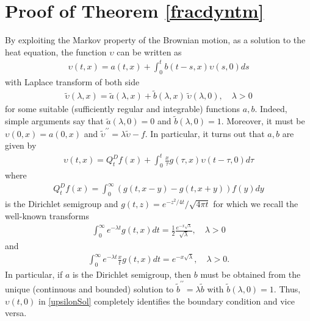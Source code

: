 \documentclass[11pt,a4paper]{article}
\theoremstyle{plain}
\theoremstyle{definition}
\theoremstyle{remark}
\begin{document}
		\section{Proof of Theorem \ref{fracdyntm}}
		\label{proof1}
		By exploiting the Markov property of the Brownian motion, as a solution to the heat equation, the function $\upsilon$ can be written as
		\begin{align}
			\label{abWITHsol}
			\upsilon(t,x) = a(t,x) + \int_0^t b(t-s, x) \upsilon(s,0)ds
		\end{align}
		with Laplace transform of both side
		\begin{align*}
			\tilde{\upsilon}(\lambda, x) = \tilde{a}(\lambda, x) + \tilde{b}(\lambda, x)\, \tilde{\upsilon}(\lambda, 0), \quad \lambda>0
		\end{align*}
		for some suitable (sufficiently regular and integrable) functions $a,b$. Indeed, simple arguments say that $\tilde{a}(\lambda, 0)=0$ and $\tilde{b}(\lambda, 0)=1$. Moreover, it must be $\upsilon(0,x) = a(0, x)$ and $\tilde{\upsilon}^{\prime \prime} = \lambda \tilde{\upsilon} - f$. In particular, it turns out that $a,b$ are given by
		\begin{align}
			\label{upsilonSol}
			\upsilon(t,x)=Q_t^D f(x)+\int_0^t \frac{x}{\tau} g(\tau,x) \upsilon(t-\tau,0) d\tau
		\end{align}
		where
		\begin{align*}
			Q_t^D f(x)=\int_0^\infty (g(t,x-y)-g(t,x+y))f(y) dy
		\end{align*}
		is the Dirichlet semigroup and $g(t, z) = e^{-z^2/ 4t}/\sqrt{4 \pi t}$  for which we recall the well-known transforms
		\begin{align}
			\label{gLap1}
			\int_0^\infty e^{-\lambda t} g(t,x) dt = \frac{1}{2}\frac{e^{-x \sqrt \lambda}}{\sqrt \lambda}, \quad \lambda >0
		\end{align}
		and
		\begin{align}
			\label{gLap2}
			\int_0^\infty e^{-\lambda t} \frac{x}{t} g(t,x) dt = e^{-x \sqrt \lambda}, \quad \lambda>0.
		\end{align}
		In particular, if $a$ is the Dirichlet semigroup, then $b$ must be obtained from the unique (continuous and bounded) solution to $\tilde{b}^{\prime \prime} = \lambda \tilde{b}$ with $\tilde{b}(\lambda, 0)=1$. Thus, $\upsilon(t, 0)$ in \eqref{upsilonSol} completely identifies the boundary condition and vice versa.
		
\end{document}
